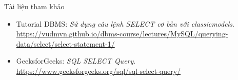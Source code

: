 \documentclass[aspectratio=169,11pt]{beamer}
\begin{document}
\begin{frame}{Tài liệu tham khảo}
\small
\begin{itemize}
  \item Tutorial DBMS: \textit{Sử dụng câu lệnh SELECT cơ bản với classicmodels}.\\
  {\tiny\url{https://vudmvn.github.io/dbms-course/lectures/MySQL/querying-data/select/select-statement-1/}}
  \item GeeksforGeeks: \textit{SQL SELECT Query}.\\
  {\tiny\url{https://www.geeksforgeeks.org/sql/sql-select-query/}}
\end{itemize}
\end{frame}
\end{document}
